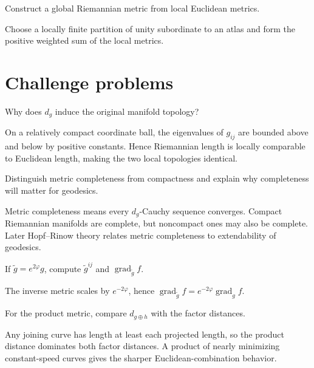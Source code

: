 \begin{problem}\label{prob:vii20-12}
Construct a global Riemannian metric from local Euclidean metrics.
\end{problem}
\begin{solution}
Choose a locally finite partition of unity subordinate to an atlas and form the positive weighted sum of the local metrics.
\end{solution}

\section{Challenge problems}

\begin{problem}\label{prob:vii20-ch01}
Why does \(d_g\) induce the original manifold topology?
\end{problem}
\begin{solution}
On a relatively compact coordinate ball, the eigenvalues of \(g_{ij}\) are bounded above and below by positive constants. Hence Riemannian length is locally comparable to Euclidean length, making the two local topologies identical.
\end{solution}

\begin{problem}\label{prob:vii20-ch02}
Distinguish metric completeness from compactness and explain why completeness will matter for geodesics.
\end{problem}
\begin{solution}
Metric completeness means every \(d_g\)-Cauchy sequence converges. Compact Riemannian manifolds are complete, but noncompact ones may also be complete. Later Hopf--Rinow theory relates metric completeness to extendability of geodesics.
\end{solution}

\begin{problem}\label{prob:vii20-ch03}
If \(\widetilde g=e^{2\varphi}g\), compute \(\widetilde g^{ij}\) and \(\operatorname{grad}_{\widetilde g}f\).
\end{problem}
\begin{solution}
The inverse metric scales by \(e^{-2\varphi}\), hence \(\operatorname{grad}_{\widetilde g}f=e^{-2\varphi}\operatorname{grad}_g f\).
\end{solution}

\begin{problem}\label{prob:vii20-ch04}
For the product metric, compare \(d_{g\oplus h}\) with the factor distances.
\end{problem}
\begin{solution}
Any joining curve has length at least each projected length, so the product distance dominates both factor distances. A product of nearly minimizing constant-speed curves gives the sharper Euclidean-combination behavior.
\end{solution}

